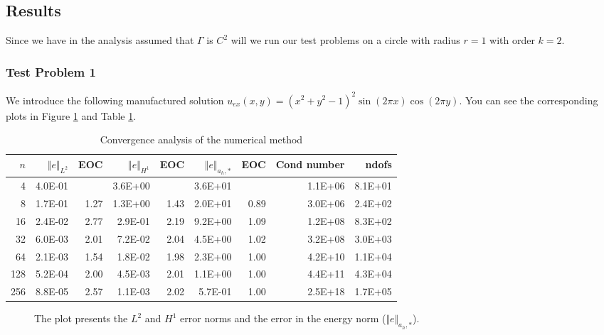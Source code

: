 
\subsection{Results}%
\label{sub:results}

Since we have in the analysis assumed that $\Gamma $ is $C^2 $ will we run our test problems on a circle with radius $r=1$ with order $k=2$.

\subsubsection{Test Problem 1}%
\label{ssub:test_problem_1}


We introduce the following manufactured solution $u_{ex}(x,y) = (x^2 + y^2 - 1)^2 \sin(2\pi x) \cos(2\pi y)$. You can see the corresponding plots in Figure \ref{fig:CutFEM_error1} and Table \ref{table:CutFEM_error1}.


\begin{table}[h!]
    \caption{Convergence analysis of the numerical method}
    \label{table:CutFEM_error1}
    \begin{tabular}{rrrrrrrrr}
    \hline\hline
    \textbf{$n$} & \textbf{$\Vert e \Vert_{L^2}$} & \textbf{EOC} & \textbf{$ \Vert e \Vert_{H^1}$} & \textbf{EOC} & \textbf{$\Vert e \Vert_{ a_h,* }$} & \textbf{EOC} & \textbf{Cond number} & \textbf{ndofs} \\\hline
    4 & 4.0E-01 &  & 3.6E+00 &  & 3.6E+01 &  & 1.1E+06 & 8.1E+01 \\
    8 & 1.7E-01 & 1.27 & 1.3E+00 & 1.43 & 2.0E+01 & 0.89 & 3.0E+06 & 2.4E+02 \\
    16 & 2.4E-02 & 2.77 & 2.9E-01 & 2.19 & 9.2E+00 & 1.09 & 1.2E+08 & 8.3E+02 \\
    32 & 6.0E-03 & 2.01 & 7.2E-02 & 2.04 & 4.5E+00 & 1.02 & 3.2E+08 & 3.0E+03 \\
    64 & 2.1E-03 & 1.54 & 1.8E-02 & 1.98 & 2.3E+00 & 1.00 & 4.2E+10 & 1.1E+04 \\
    128 & 5.2E-04 & 2.00 & 4.5E-03 & 2.01 & 1.1E+00 & 1.00 & 4.4E+11 & 4.3E+04 \\
    256 & 8.8E-05 & 2.57 & 1.1E-03 & 2.02 & 5.7E-01 & 1.00 & 2.5E+18 & 1.7E+05 \\\hline\hline
  \end{tabular}
\end{table}


\begin{figure}[h!]
    \centering
    
    \caption{The plot presents the $L^2$ and $H^1$ error norms and the error in the energy norm ($\Vert e \Vert_{a_h,*}$).}
    \label{fig:CutFEM_error1}
\end{figure}

